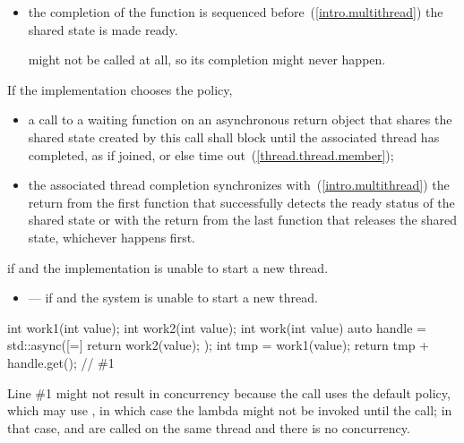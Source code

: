 \begin{itemdescr}
\begin{itemize}
\item
the completion of the function  is sequenced before~(\ref{intro.multithread}) the
shared state is made ready. \begin{note}  might not be called at all,
so its completion might never happen. \end{note}
\end{itemize}

If the implementation chooses the  policy,

\begin{itemize}
\item
a call to a waiting function on an asynchronous return
object that shares the shared state created by this  call shall
block until the associated thread has completed, as if joined, or else time
out~(\ref{thread.thread.member});

\item
the associated thread completion
synchronizes with~(\ref{intro.multithread})
the return from
the first function
that successfully detects the ready status of the shared state or 
with the return from the last
function that releases the shared state, whichever
happens first.
\end{itemize}


\pnum
\throws {} if  and the
implementation is unable to start a new thread.

\pnum
\errors
\begin{itemize}
\item {} --- if
 and the system is unable to start a new thread.
\end{itemize}
\end{itemdescr}

\pnum
\begin{example}
\begin{codeblock}
int work1(int value);
int work2(int value);
int work(int value) {
  auto handle = std::async([=]{ return work2(value); });
  int tmp = work1(value);
  return tmp + handle.get();    // \#1
}
\end{codeblock}

\begin{note} Line \#1 might not result in concurrency because
the  call uses the default policy, which may use
, in which case the lambda might not be invoked until the
 call; in that case,  and  are called on the
same thread and there is no concurrency.
\end{note}
\end{example}

